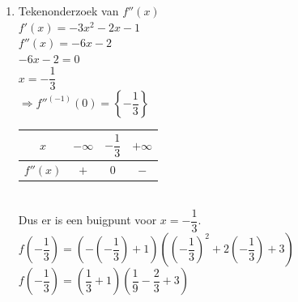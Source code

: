\documentclass[a4paper]{article}
\begin{document}
\begin{enumerate}
$f'(x)=0 \Leftrightarrow 3x^2+2x+1=0$\\

$\Delta=2^2-4\cdot 1\cdot 3=-8 \Rightarrow$ nulpunt $\notin \mathbb{R}$\\

Dus $f'(x)<0 \text{ voor alle } x\in\mathbb{R}$\\

$\Rightarrow f'^{(-1)}(0)=\varnothing $\\


\begin{tabular}{c|cc}
$x$ & $-\infty$ & $+\infty$ \\ \hline

$f'(x)$ & $-$ & $-$ \\

\end{tabular}\\

\item Tekenonderzoek van $f''(x)$\\

$f'(x)=-3x^2-2x-1$\\

$f''(x)=-6x-2$\\

$-6x-2=0$\\

$x=-\dfrac{1}{3}$\\

$\Rightarrow f''^{(-1)}(0)=\left\{-\dfrac{1}{3}\right\} $\\

\begin{tabular}{c|ccc}
$x$ & $-\infty$ & $-\dfrac{1}{3}$ & $+\infty$ \\ \hline

$f''(x)$ & $+$ & $0$ & $-$ \\

\end{tabular}\\

Dus er is een buigpunt voor $x=-\dfrac{1}{3}$.\\

$f\left(-\dfrac{1}{3}\right)=\left(-\left(-\dfrac{1}{3}\right)+1\right)\left(\left(-\dfrac{1}{3}\right)^2+2\left(-\dfrac{1}{3}\right)+3\right)$\\

$f\left(-\dfrac{1}{3}\right)=\left(\dfrac{1}{3}+1\right)\left(\dfrac{1}{9}-\dfrac{2}{3}+3\right)$\\


\end{enumerate}
\end{document}
